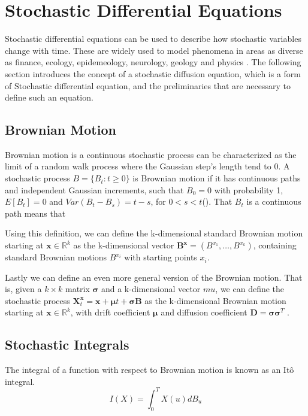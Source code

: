 
\section{Stochastic Differential Equations}
Stochastic differential equations can be used to describe how stochastic variables change with time. These are widely used to model phenomena in areas as diverse as finance, ecology, epidemeology, neurology, geology and physics \cite{iacus_simulation_2008}. The following section introduces the concept of a stochastic diffusion equation, which is a form of Stochastic differential equation, and the preliminaries that are necessary to define such an equation.


\subsection{Brownian Motion}
Brownian motion is a continuous stochastic process can be characterized as the limit of a random walk process where the Gaussian step's length tend to 0. A stochastic process $B = \{B_t:t\geq 0\}$ is Brownian motion if it has continuous paths and independent Gaussian increments, such that $B_0 = 0$ with probability 1, $E[B_t] = 0$ and $Var(B_t - B_s) = t-s$, for $0 < s < t$(\cite{iacus_simulation_2008}).  That $B_t$ is a continuous path means that

Using this definition, we can define the k-dimensional standard Brownian motion starting at $\textbf{x} \in \mathbb{R}^k$ as the k-dimensional vector $\mathbf{B}^\mathbf{x} = (B^{x_1}, \dots , B^{x_k})$, containing standard Brownian motions $B^{x_i}$ with starting points $x_i$\cite{bhattacharya_continuous_2023}.

Lastly we can define an even more general version of the Brownian motion. That is, given a $k \times k$ matrix $\pmb{\sigma}$ and a k-dimensional vector $mu$, we can define the stochastic process $\mathbf{X}_t^\mathbf{x} = \mathbf{x} + \pmb{\mu}t + \pmb{\sigma} \mathbf{B}$ as the k-dimensional Brownian motion starting at $\mathbf{x} \in \mathbb{R}^k$, with drift coefficient $\pmb{\mu}$ and diffusion coefficient $\mathbf{D} = \pmb{\sigma} \pmb{\sigma}^T$ \cite{bhattacharya_continuous_2023}.

\subsection{Stochastic Integrals}
The integral of a function with respect to Brownian motion is known as an Itô integral. 
$$I(X) = \int_0^T X(u)dB_u$$

